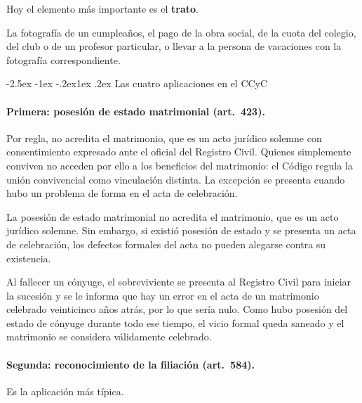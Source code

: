 \documentclass[12pt,oneside]{book}
\makeatletter
\renewcommand\subsection{\@startsection{subsection}{2}{\z@}%
  {-2.5ex \@plus -1ex \@minus -.2ex}{1ex \@plus .2ex}%
  {\normalfont\normalsize\bfseries}}
\makeatother
\begin{document}
Hoy el elemento más importante es el \textbf{trato}.

\begin{ejemplo}
La fotografía de un cumpleaños, el pago de la obra social, de la cuota del colegio, del club o de un profesor particular, o llevar a la persona de vacaciones con la fotografía correspondiente.
\end{ejemplo}

\subsection{Las cuatro aplicaciones en el CCyC}

\paragraph{Primera: posesión de estado matrimonial (art.~423).} Por regla, no acredita el matrimonio, que es un acto jurídico solemne con consentimiento expresado ante el oficial del Registro Civil. Quienes simplemente conviven no acceden por ello a los beneficios del matrimonio: el Código regula la unión convivencial como vinculación distinta. La excepción se presenta cuando hubo un problema de forma en el acta de celebración.

\begin{regla}
La posesión de estado matrimonial no acredita el matrimonio, que es un acto jurídico solemne. Sin embargo, si existió posesión de estado y se presenta un acta de celebración, los defectos formales del acta no pueden alegarse contra su existencia.
\end{regla}

\begin{ejemplo}
Al fallecer un cónyuge, el sobreviviente se presenta al Registro Civil para iniciar la sucesión y se le informa que hay un error en el acta de un matrimonio celebrado veinticinco años atrás, por lo que sería nulo. Como hubo posesión del estado de cónyuge durante todo ese tiempo, el vicio formal queda saneado y el matrimonio se considera válidamente celebrado.
\end{ejemplo}

\paragraph{Segunda: reconocimiento de la filiación (art.~584).} Es la aplicación más típica.
\end{document}
